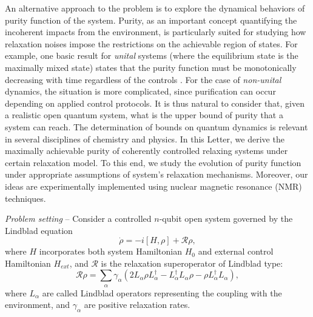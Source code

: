 \documentclass[prl,aps,twocolumn, reprint, amsmath,amssymb,showpacs,superscriptaddress]{revtex4}
\begin{document}
An alternative approach to the problem is to explore the dynamical behaviors of purity function of the system. Purity, as an important concept quantifying the incoherent impacts from the environment, is particularly suited for studying how relaxation noises impose the restrictions on the achievable region of states. For example, one basic result for \emph{unital} systems (where the equilibrium state is the maximally mixed state) states that the purity function must be monotonically decreasing with time regardless of the controls \cite{LSA}. For the case of \emph{non-unital} dynamics, the situation is more complicated, since purification can occur depending on applied control protocols. It is thus natural to consider that, given a realistic open quantum system, what is the upper bound of purity that a system can reach. The determination of bounds on quantum dynamics is relevant in several
disciplines of chemistry and physics. In this Letter, we derive the maximally achievable  purity of coherently controlled relaxing systems under certain relaxation model. To this end, we study the evolution of purity function under appropriate assumptions of system's relaxation mechanisms. Moreover, our ideas are experimentally implemented using nuclear magnetic resonance (NMR) techniques.


\emph{Problem setting} -- Consider a controlled $n$-qubit open system governed by the Lindblad equation \cite{Lindblad}
\begin{equation}
\label{Lindblad}
\dot \rho   =  - i[H,\rho ] +  \mathcal{R}\rho ,
\end{equation}
where $H$ incorporates both system Hamiltonian $H_0$ and external control Hamiltonian $H_{ext}$, and $\mathcal{R}$ is the relaxation superoperator of Lindblad type:
\begin{equation}
\mathcal{R}\rho =  \sum\limits_\alpha  {{\gamma _\alpha }\left( {2{L_\alpha }\rho L_\alpha ^\dag  - L_\alpha ^\dag {L_\alpha }\rho  - \rho L_\alpha ^\dag {L_\alpha }} \right)} ,
\end{equation}
where ${{L_\alpha }}$ are called Lindblad operators representing the coupling with the environment, and $\gamma_\alpha$ are positive relaxation rates.
\end{document}
